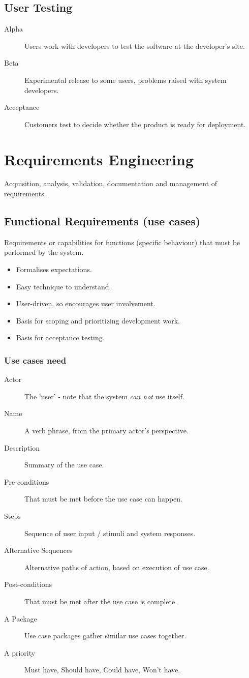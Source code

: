 \documentclass[landscape]{cheat}
\begin{document}
\begin{multicols}{3}
\subsection{User Testing}
\begin{description}
    \item[Alpha] Users work with developers to test the software at the developer's site.
    \item[Beta] Experimental release to some users, problems raised with system developers.
    \item[Acceptance] Customers test to decide whether the product is ready for deployment.
\end{description}

\section{Requirements Engineering}
Acquisition, analysis, validation, documentation and management of requirements.

\subsection{Functional Requirements (use cases)}
Requirements or capabilities for functions (specific behaviour) that must be performed by the system.
\begin{itemize}
    \item Formalises expectations.
    \item Easy technique to understand.
    \item User-driven, so encourages user involvement.
    \item Basis for scoping and prioritizing development work.
    \item Basis for acceptance testing.
\end{itemize}

\subsubsection{Use cases need}
\begin{description}
    \item[Actor] The 'user' - note that the system \textit{can not} use itself.
    \item[Name] A verb phrase, from the primary actor's perspective.
    \item[Description] Summary of the use case.
    \item[Pre-conditions] That must be met before the use case can happen.
    \item[Steps] Sequence of user input / stimuli and system responses.
    \item[Alternative Sequences] Alternative paths of action, based on execution of use case.
    \item[Post-conditions] That must be met after the use case is complete.
    \item[A Package] Use case packages gather similar use cases together.
    \item[A priority] Must have, Should have, Could have, Won't have.
\end{description}


\end{multicols}
\end{document}
